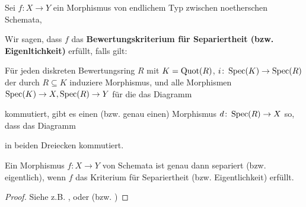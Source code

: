 \begin{bem}
  \label{bem:10.6}
  Sei $f\colon X \to Y$ ein Morphismus von endlichem Typ zwischen noetherschen Schemata,

  Wir sagen, dass $f$ das \textbf{Bewertungskriterium für Separiertheit (bzw. Eigenltichkeit)} erfüllt, falls gilt:
    
  Für jeden diskreten Bewertungsring $R$ mit $K = \operatorname{Quot}(R)$, $i \colon \operatorname{Spec}(K) \to \operatorname{Spec}(R)$ der durch $R \subseteq K$ induziere Morphismus, und alle Morphismen $\operatorname{Spec}(K) \to X, \operatorname{Spec}(R) \to Y$ für die das Diagramm
  \begin{center}
  \end{center}
  kommutiert, gibt es einen (bzw. genau einen) Morphismus $d \colon \operatorname{Spec}(R) \to X$ so, dass das Diagramm
  \begin{center}
  \end{center}
  in beiden Dreiecken kommutiert.
\end{bem}

\begin{thm}
  \label{thm:10.7}
  Ein Morphismus $f \colon X \to Y$ von Schemata ist genau dann separiert (bzw. eigentlich), wenn $f$ das Kriterium für Separiertheit (bzw. Eigentlichkeit) erfüllt.
  \begin{proof}
    Siehe z.B. \cite[7.2.3]{grothendieck1971elements}, oder \cite[Thm. 15.9]{goertz2010algebraic} (bzw. \cite[Thm 7.3.8]{grothendieck1971elements})
  \end{proof}
\end{thm}
